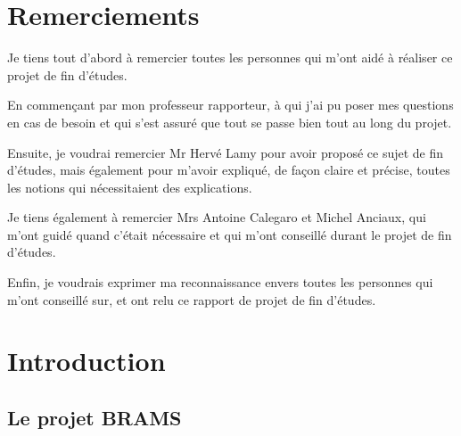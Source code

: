 \documentclass[11pt]{article}
\newenvironment{remerciements}
  {
   \thispagestyle{empty}%
   \vspace*{\stretch{1}}%
   \itshape             %
  }
  {\par %
   \vspace{\stretch{3}} %
   \clearpage           %
  }
\begin{document}
\section*{Remerciements}
\begin{remerciements}

    Je tiens tout d'abord à remercier toutes les personnes qui m'ont aidé à réaliser ce projet de fin d'études.\\
    \par
    En commençant par mon professeur rapporteur, à qui j'ai pu poser mes questions en cas de besoin et qui s'est assuré que tout se passe bien tout au long du projet.\\
    \par
    Ensuite, je voudrai remercier Mr Hervé Lamy pour avoir proposé ce sujet de fin d'études, mais également pour m'avoir expliqué, de façon claire et précise, toutes les notions qui nécessitaient des explications.\\
    \par
    Je tiens également à remercier Mrs Antoine Calegaro et Michel Anciaux, qui m'ont guidé quand c'était nécessaire et qui m'ont conseillé durant le projet de fin d'études.\\
    \par
    Enfin, je voudrais exprimer ma reconnaissance envers toutes les personnes qui m'ont conseillé sur, et ont relu ce rapport de projet de fin d'études.
\end{remerciements}

\newpage

\tableofcontents

\newpage

\section{Introduction}

\subsection{Le projet BRAMS}
\end{document}
